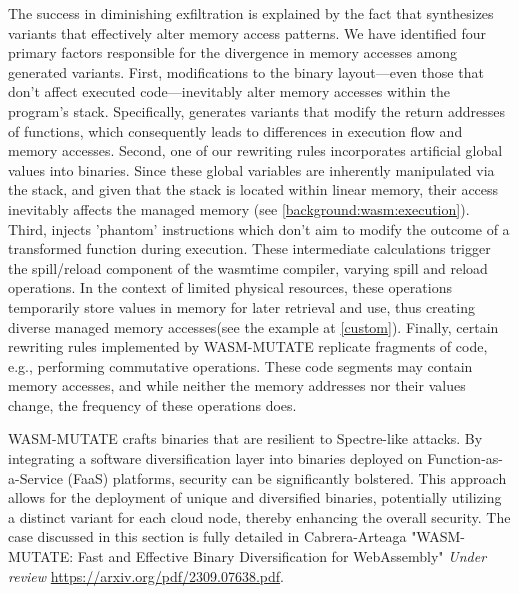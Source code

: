  The success in diminishing exfiltration is explained by the fact that \tool synthesizes variants that effectively alter memory access patterns. 
We have identified four primary factors responsible for the divergence in memory accesses among \tool generated variants.
First, modifications to the binary layout—even those that don't affect executed code—inevitably alter memory accesses within the program's stack. 
Specifically, \tool generates variants that modify the return addresses of functions, which consequently leads to differences in execution flow and memory accesses.
Second, one of our rewriting rules incorporates artificial global values into \wasm binaries. 
Since these global variables are inherently manipulated via the stack, and given that the stack is located within linear memory, their access inevitably affects the managed memory (see \autoref{background:wasm:execution}).
Third, \tool injects 'phantom' instructions which don't aim to modify the outcome of a transformed function during execution. 
These intermediate calculations trigger the spill/reload component of the wasmtime compiler, varying spill and reload operations. 
In the context of limited physical resources, these operations temporarily store values in memory for later retrieval and use, thus creating diverse managed memory accesses(see the example at \autoref{custom}).
Finally, certain rewriting rules implemented by WASM-MUTATE replicate fragments of code, e.g., performing commutative operations. 
These code segments may contain memory accesses, and while neither the memory addresses nor their values change, the frequency of these operations does.




\begin{tcolorbox}[title=Contribution paper,boxrule=1pt,arc=.2em,boxsep=1.0mm]
    WASM-MUTATE crafts \Wasm binaries that are resilient to Spectre-like attacks. 
    By integrating a software diversification layer into \Wasm binaries deployed on Function-as-a-Service (FaaS) platforms, security can be significantly bolstered. 
    This approach allows for the deployment of unique and diversified \Wasm binaries, potentially utilizing a distinct variant for each cloud node, thereby enhancing the overall security.
    The case discussed in this section is fully detailed in Cabrera-Arteaga \etal "WASM-MUTATE: Fast and Effective Binary Diversification for WebAssembly"
    \emph{Under review}
    \url{https://arxiv.org/pdf/2309.07638.pdf}. 
\end{tcolorbox}



